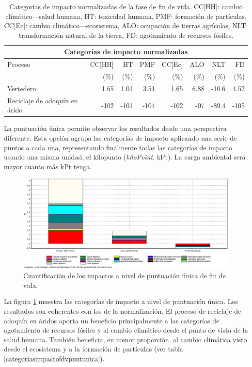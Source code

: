 \begin{table}[!htb]
\centering
\begin{tabular}{p{4cm}rrrrrrr}
\toprule
\multicolumn{8}{c}{Categorías de impacto normalizadas}\\
\midrule
Proceso & CC[HH] & HT & PMF & CC[Ec] & ALO & NLT & FD\\
 &  (\%) & (\%) & (\%) & (\%) & (\%) & (\%) & (\%)\\
\midrule
Vertedero & 1.65 & 1.01 & 3.51 & 1.65 & 6.88 & -10.6 & 4.52\\
Reciclaje de adoquín en árido & -102 & -101 & -104 & -102 & -07 & -89.4 & -105\\
\bottomrule
\end{tabular}
\caption[Categorías de impacto normalizadas de la fase de fin de vida.]{Categorías de impacto normalizadas de la fase de fin de vida. CC[HH]: cambio climático—salud humana, HT: toxicidad humana, PMF: formación de partículas, CC[Ec]: cambio climático—ecosistema, ALO: ocupación de tierras agrícolas, NLT: transformación natural de la tierra, FD: agotamiento de recursos fósiles.}
\label{categoriasimpactofdv}
\end{table}

La puntuación única permite observar los resultados desde una perspectiva diferente. Esta opción agrupa las categorías de impacto aplicando una serie de puntos a cada una, representando finalmente todas las categorías de impacto usando una misma unidad, el kilopunto (\textit{kiloPoint}, kPt). La carga ambiental será mayor cuanto más kPt tenga.

\begin{figure}[!htb]
\centering
\includegraphics[width=15cm]{img/fdv_puntuacionunica.png}
\caption{Cuantificación de los impactos a nivel de puntuación única de fin de vida.}
\label{fig:fdv_puntuacionunica}
\end{figure}

La figura \ref{fig:fdv_puntuacionunica} muestra las categorías de impacto a nivel de puntuación única. Los resultados son coherentes con los de la normalización. El proceso de reciclaje de adoquín en áridos aporta un beneficio principalmente a las categorías de agotamiento de recursos fósiles y al cambio climático desde el punto de vista de la salud humana. También beneficia, en menor proporción, al cambio climática visto desde el ecosistema y a la formación de partículas (ver tabla \ref{categoriasimpactofdvpuntunica}).

